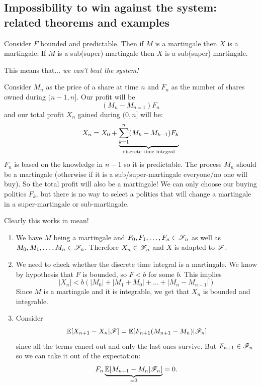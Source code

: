 \documentclass{report}
\begin{document}
\subsection{Impossibility to win against the system: related theorems and examples}
\begin{theorem}
	Consider $F$ bounded and predictable. Then if $M$ is a martingale then $X$ is a martingale; If $M$ is a sub(super)-martingale then $X$ is a sub(super)-martingale.
\end{theorem}
This means that... \emph{we can't beat the system!}
\begin{flushright}
	\hspace*{2.5cm}
\end{flushright}
\begin{example}
	Consider $M_{n}$ as the price of a share at time $n$ and $F_{n}$ as the number of shares owned during $(n-1,n]$. Our profit will be 
	\[(M_{n}-M_{n=1})F_{n}\]
	and our total profit $X_{n}$ gained during $(0,n]$ will be:
	\[X_{n}=X_{0}+\underbrace{\sum_{k=1}^{n}(M_{k}-M_{k-1})F_{k}}_{\mathclap{\text{discrete time integral}}}\]
	$F_{n}$ is based on the knowledge in $n-1$ so it is predictable. The process $M_{n}$ should be a martingale (otherwise if it is a sub/super-martingale everyone/no one will buy). So the total profit will also be a martingale! We can only choose our buying politics $F_{k}$, but there is no way to select a politics that will change a martingale in a super-martingale or sub-martingale.
\end{example}
Clearly this works in mean! 
\begin{fancyproof}
	\begin{enumerate}
		\item	We have $M$ being a martingale and $F_0,F_1,\ldots,F_n\in\mathscr{F}_{n}$ as well as $M_0,M_1,\ldots,M_{n}\in\mathscr{F}_n$. Therefore $X_{n}\in\mathscr{F}_{n}$ and $X$ is adapted to $\mathscr{F}$.
		\item We need to check whether the discrete time integral is a martingale. We know by hypothesis that $F$ is bounded, so $F<b$ for some $b$. This implies
		\begin{equation*}
			|X_{n}|<b(|M_{0}|+|M_1+M_0|+\ldots+|M_n-M_{n-1}|)
		\end{equation*}
		Since $M$ is a martingale and it is integrable, we get that $X_n$ is bounded and integrable.
		\item Consider
		\begin{equation*}
			\mathbb{E}[X_{n+1}-X_{n}|\mathscr{F}]=\mathbb{E}[F_{n+1}(M_{n+1}-M_{n})|\mathscr{F}_n]
		\end{equation*}
		since all the terms cancel out and only the last ones survive. But $F_{n+1}\in\mathscr{F}_{n}$ so we can take it out of the expectation:
		\[F_{n}\underbrace{\mathbb{E}[M_{n+1}-M_{n}|\mathscr{F}_{n}]}_{=0}=0.\]
	\end{enumerate}
\end{fancyproof}
\end{document}
